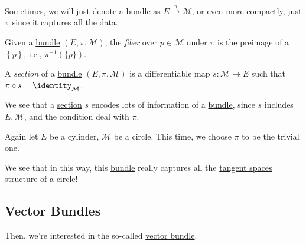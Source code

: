 \begin{notation}
	Sometimes, we will just denote a \hyperref[def:bundle]{bundle} as \(E \overset{\pi }{\to } \mathcal{M} \), or even more compactly, just \(\pi \) since it captures all the data.
\end{notation}

\begin{definition}[Fiber]\label{def:fiber}
	Given a \hyperref[def:bundle]{bundle} \((E, \pi , \mathcal{M} )\), the \emph{fiber} over \(p\in \mathcal{M} \) under \(\pi\) is the preimage of a \(\left\{ p \right\} \), i.e., \(\pi ^{-1} (\{p\})\).
\end{definition}

\begin{definition}[Section]\label{def:section}
	A \emph{section} of a \hyperref[def:bundle]{bundle} \((E, \pi , \mathcal{M} )\) is a differentiable map \(s\colon \mathcal{M} \to E\) such that \(\pi \circ s =\identity_{\mathcal{M} } \).
\end{definition}

\begin{remark}
	We see that a \hyperref[def:section]{section} \(s\) encodes lots of information of a \hyperref[def:bundle]{bundle}, since \(s\) includes \(E, \mathcal{M}\), and the condition deal with \(\pi \).
\end{remark}


\begin{eg}
	Again let \(E\) be a cylinder, \(\mathcal{M} \) be a circle. This time, we choose \(\pi \) to be the trivial one.

	\begin{center}
	\end{center}

	We see that in this way, this \hyperref[def:bundle]{bundle} really captures all the \hyperref[def:tangent-space]{tangent spaces} structure of a circle!
\end{eg}

\subsection{Vector Bundles}
Then, we're interested in the so-called \hyperref[def:vector-bundle]{vector bundle}.

